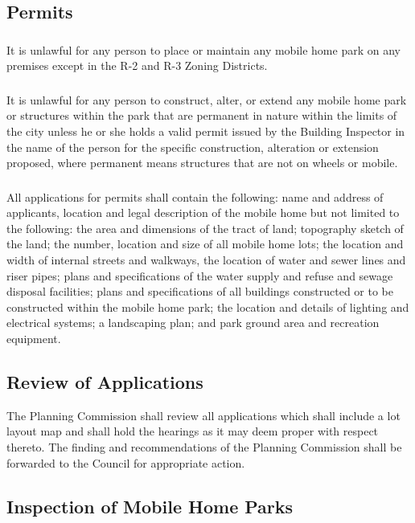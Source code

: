 \subsection{Permits}
\subsubsection{}
It is unlawful for any person to place or maintain any mobile home park on any premises except in the R-2 and R-3 Zoning Districts.
\subsubsection{}
It is unlawful for any person to construct, alter, or extend any mobile home park or structures within the park that are permanent in nature within the limits of the city unless he or she holds a valid permit issued by the Building Inspector in the name of the person for the specific construction, alteration or extension proposed, where permanent means structures that are not on wheels or mobile.
\subsubsection{}
All applications for permits shall contain the following: name and address of applicants, location and legal description of the mobile home but not limited to the following: the area and dimensions of the tract of land; topography sketch of the land; the number, location and size of all mobile home lots; the location and width of internal streets and walkways, the location of water and sewer lines and riser pipes; plans and specifications of the water supply and refuse and sewage disposal facilities; plans and specifications of all buildings constructed or to be constructed within the mobile home park; the location and details of lighting and electrical systems; a landscaping plan; and park ground area and recreation equipment.
\subsection{Review of Applications}
The Planning Commission shall review all applications which shall include a lot layout map and shall hold the hearings as it may deem proper with respect thereto. The finding and recommendations of the Planning Commission shall be forwarded to the Council for appropriate action.
\subsection{Inspection of Mobile Home Parks}
